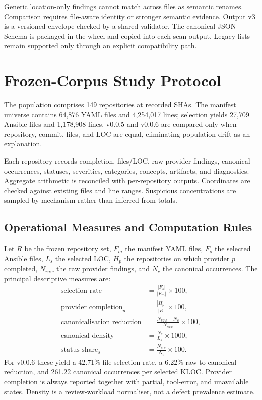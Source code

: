 Generic location-only findings cannot match across files as semantic renames.
Comparison requires file-aware identity or stronger semantic evidence. Output
v3 is a versioned envelope checked by a shared validator. The canonical JSON
Schema is packaged in the wheel and copied into each scan output. Legacy lists
remain supported only through an explicit compatibility path.

\section{Frozen-Corpus Study Protocol}
\label{sec:study_design_m}
The population comprises 149 repositories at recorded SHAs. The manifest
universe contains 64,876 YAML files and 4,254,017 lines; selection yields
27,709 Ansible files and 1,178,908 lines. v0.0.5 and v0.0.6 are compared only
when repository, commit, files, and LOC are equal, eliminating population drift
as an explanation.

Each repository records completion, files/LOC, raw provider findings, canonical
occurrences, statuses, severities, categories, concepts, artifacts, and
diagnostics. Aggregate arithmetic is reconciled with per-repository outputs.
Coordinates are checked against existing files and line ranges. Suspicious
concentrations are sampled by mechanism rather than inferred from totals.

\subsection{Operational Measures and Computation Rules}
Let $R$ be the frozen repository set, $F_m$ the manifest YAML files, $F_s$ the
selected Ansible files, $L_s$ the selected LOC, $H_p$ the repositories on which
provider $p$ completed, $N_{raw}$ the raw provider findings, and $N_c$ the
canonical occurrences. The principal descriptive measures are:
\begin{align}
\text{selection rate} &= \frac{|F_s|}{|F_m|}\times100, \\
\text{provider completion}_p &= \frac{|H_p|}{|R|}\times100, \\
\text{canonicalisation reduction} &=
  \frac{N_{raw}-N_c}{N_{raw}}\times100, \\
\text{canonical density} &= \frac{N_c}{L_s}\times1000, \\
\text{status share}_s &= \frac{N_{c,s}}{N_c}\times100.
\end{align}
For v0.0.6 these yield a 42.71\% file-selection rate, a 6.22\%
raw-to-canonical reduction, and 261.22 canonical occurrences per selected
KLOC. Provider completion is always reported together with partial,
tool-error, and unavailable states. Density is a review-workload normaliser,
not a defect prevalence estimate.

